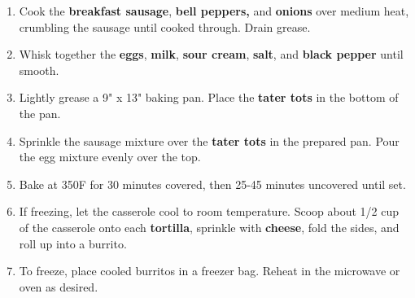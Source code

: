 \documentclass[11pt,letterpaper]{article}
\begin{document}
\begin{enumerate}
    \item Cook the \textbf{breakfast sausage}, \textbf{bell peppers,} and \textbf{onions} over medium heat, crumbling the sausage until cooked through. Drain grease.
    \item Whisk together the \textbf{eggs}, \textbf{milk},\textbf{ sour cream}, \textbf{salt}, and \textbf{black pepper} until smooth.
    \item Lightly grease a 9" x 13" baking pan. Place the \textbf{tater tots} in the bottom of the pan.
    \item Sprinkle the sausage mixture over the \textbf{tater tots} in the prepared pan. Pour the egg mixture evenly over the top. 
    \item Bake at 350F for 30 minutes covered, then 25-45 minutes uncovered until set.
    \item If freezing, let the casserole cool to room temperature. Scoop about 1/2 cup of the casserole onto each \textbf{tortilla}, sprinkle with \textbf{cheese}, fold the sides, and roll up into a burrito.
    \item To freeze, place cooled burritos in a freezer bag. Reheat in the microwave or oven as desired.
\end{enumerate}
\end{document}
